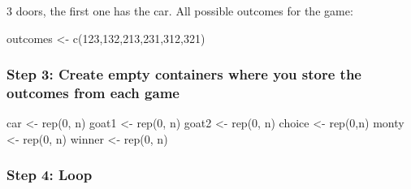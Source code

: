 \documentclass[
]{book}
\newenvironment{Shaded}{\begin{snugshade}}{\end{snugshade}}
\newcommand{\DecValTok}[1]{\textcolor[rgb]{0.00,0.00,0.81}{#1}}
\newcommand{\FunctionTok}[1]{\textcolor[rgb]{0.00,0.00,0.00}{#1}}
\newcommand{\NormalTok}[1]{#1}
\newcommand{\OtherTok}[1]{\textcolor[rgb]{0.56,0.35,0.01}{#1}}
\begin{document}
3 doors, the first one has the car. All possible outcomes for the game:

\begin{Shaded}
\begin{Highlighting}[]
\NormalTok{outcomes }\OtherTok{\textless{}{-}} \FunctionTok{c}\NormalTok{(}\DecValTok{123}\NormalTok{,}\DecValTok{132}\NormalTok{,}\DecValTok{213}\NormalTok{,}\DecValTok{231}\NormalTok{,}\DecValTok{312}\NormalTok{,}\DecValTok{321}\NormalTok{)}
\end{Highlighting}
\end{Shaded}

\hypertarget{step-3-create-empty-containers-where-you-store-the-outcomes-from-each-game}{%
\subsubsection*{Step 3: Create empty containers where you store the outcomes from each game}\label{step-3-create-empty-containers-where-you-store-the-outcomes-from-each-game}}

\begin{Shaded}
\begin{Highlighting}[]
\NormalTok{car }\OtherTok{\textless{}{-}} \FunctionTok{rep}\NormalTok{(}\DecValTok{0}\NormalTok{, n)}
\NormalTok{goat1 }\OtherTok{\textless{}{-}} \FunctionTok{rep}\NormalTok{(}\DecValTok{0}\NormalTok{, n)}
\NormalTok{goat2 }\OtherTok{\textless{}{-}} \FunctionTok{rep}\NormalTok{(}\DecValTok{0}\NormalTok{, n)}
\NormalTok{choice }\OtherTok{\textless{}{-}} \FunctionTok{rep}\NormalTok{(}\DecValTok{0}\NormalTok{,n)}
\NormalTok{monty }\OtherTok{\textless{}{-}} \FunctionTok{rep}\NormalTok{(}\DecValTok{0}\NormalTok{, n)}
\NormalTok{winner }\OtherTok{\textless{}{-}} \FunctionTok{rep}\NormalTok{(}\DecValTok{0}\NormalTok{, n)}
\end{Highlighting}
\end{Shaded}

\hypertarget{step-4-loop}{%
\subsubsection*{Step 4: Loop}\label{step-4-loop}}
\end{document}
